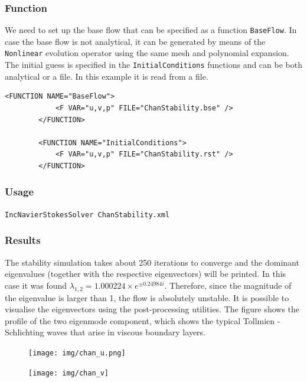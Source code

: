 \subsubsection{Function}

We need to set up the base flow that can be specified as a function \texttt{BaseFlow}. In case the base flow is not analytical, it can be generated by means of the \texttt{Nonlinear} evolution operator using the same mesh and polynomial expansion. The initial guess is specified in the \texttt{InitialConditions} functions and can be both analytical or a file. In this example it is read from a file.

    \begin{lstlisting}[style=XMLStyle]
<FUNCTION NAME="BaseFlow">
            <F VAR="u,v,p" FILE="ChanStability.bse" />
        </FUNCTION>

        <FUNCTION NAME="InitialConditions">
            <F VAR="u,v,p" FILE="ChanStability.rst" />
        </FUNCTION>
                         \end{lstlisting}

\subsubsection{Usage}

\texttt{IncNavierStokesSolver ChanStability.xml}


\subsubsection{Results}

The stability simulation takes about 250 iterations to converge and the dominant eigenvalues (together with the respective eigenvectors) will be printed. In this case it was found $    \lambda_{1,2}=1.000224 \times e^{\pm 0.24984i}$. Therefore, since the magnitude of the eigenvalue is larger than 1, the flow is absolutely unstable. It is possible to visualise the eigenvectors using the post-processing utilities. The figure shows the profile of the two eigenmode component, which shows the typical Tollmien - Schlichting waves that arise in viscous boundary layers.

\begin{figure}[!htbp]
\centering
 {\texttt{[image: img/chan\_u.png]}}
   \caption {}
\end{figure}

\begin{figure}[!htbp]
\centering
 {\texttt{[image: img/chan\_v]}}
    \caption {}
\end{figure}

